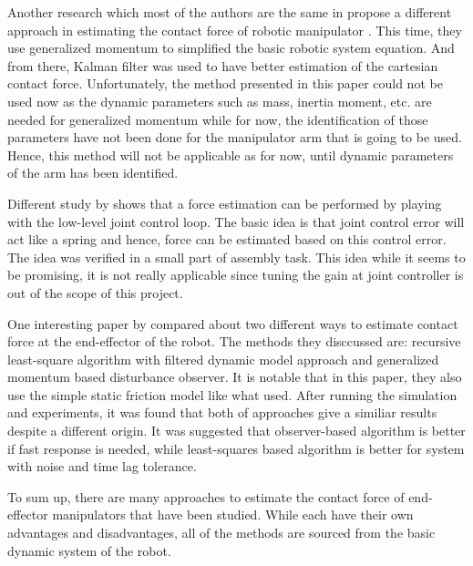 Another research which most of the authors are the same in \cite{Hao14} propose a different approach in estimating the contact force of robotic manipulator \cite{Hao15}. This time, they use generalized momentum to simplified the basic robotic system equation. And from there, Kalman filter was used to have better estimation of the cartesian contact force. Unfortunately, the method presented in this paper could not be used now as the dynamic parameters such as mass, inertia moment, etc. are needed for generalized momentum while for now, the identification of those parameters have not been done for the manipulator arm that is going to be used. Hence, this method will not be applicable as for now, until dynamic parameters of the arm has been identified.


Different study by \cite{Stolt12} shows that a force estimation can be performed by playing with the low-level joint control loop. The basic idea is that joint control error will act like a spring and hence, force can be estimated based on this control error. The idea was verified in a small part of assembly task. This idea while it seems to be promising, it is not really applicable since tuning the gain at joint controller is out of the scope of this project.  


One interesting paper by \cite{Beyl11} compared about two different ways to estimate contact force at the end-effector of the robot. The methods they disccussed are: recursive least-square algorithm with filtered dynamic model approach and generalized momentum based disturbance observer. It is notable that in this paper, they also use the simple static friction model like what \cite{Hao14} used. After running the simulation and experiments, it was found that both of approaches give a similiar results despite a different origin. It was suggested that observer-based algorithm is better if fast response is needed, while least-squares based algorithm is better for system with noise and time lag tolerance.


To sum up, there are many approaches to estimate the contact force of end-effector manipulators that have been studied. While each have their own advantages and disadvantages, all of the methods are sourced from the basic dynamic system of the robot. 

